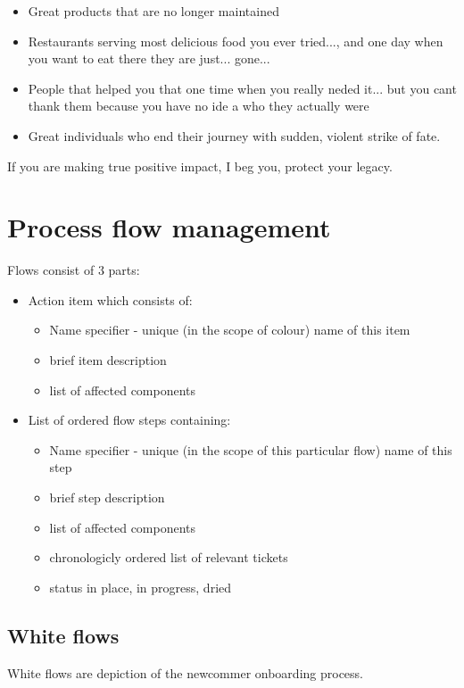 \begin{enumerate}
\begin{itemize}
    \item Great products that are no longer maintained
    \item Restaurants serving most delicious food you ever tried..., and one day when you want to eat there they are just... gone...
    \item People that helped you that one time when you really neded it... but you cant thank them because you have no ide a who they actually were 
    \item Great individuals who end their journey with sudden, violent strike of fate.
  \end{itemize} 
  If you are making true positive impact, I beg you, protect your legacy.
\end{enumerate} 
\newpage
\section{Process flow management}
Flows consist of 3 parts:
\begin{itemize}
  \item Action item which consists of:
  \begin{itemize}
    \item Name specifier - unique (in the scope of colour) name of this item
    \item brief item description
    \item list of affected components
  \end{itemize}
  \item List of ordered flow steps containing:
  \begin{itemize}
    \item Name specifier - unique (in the scope of this particular flow) name of this step
    \item brief step description
    \item list of affected components
    \item chronologicly ordered list of relevant tickets
    \item status {in place, in progress, dried}
  \end{itemize}
\end{itemize}

\subsection{White flows}\label{philo:white:flow}
White flows are depiction of the newcommer onboarding process. 
